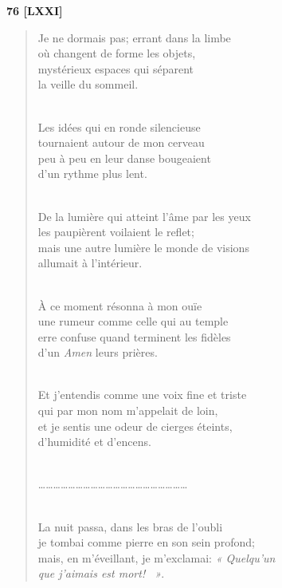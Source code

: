 \documentclass[a4paper,11pt]{book}
\begin{document}
\bigskip

\begin{center} {\bf 76 [LXXI]}  \end{center}

\begin{verse}
Je ne dormais pas; errant dans la limbe \\
où changent de forme les objets, \\
mystérieux espaces qui séparent \\
la veille du sommeil. \\ \

Les idées qui en ronde silencieuse \\
tournaient autour de mon cerveau \\
peu à peu en leur danse bougeaient \\
d'un rythme plus lent. \\ \

De la lumière qui atteint l'âme par les yeux \\
les paupièrent voilaient le reflet; \\
mais une autre lumière le monde de visions \\
allumait à l'intérieur. \\ \

À ce moment résonna à mon ouïe \\
une rumeur comme celle qui au temple \\
erre confuse quand terminent les fidèles \\
d'un {\em Amen\/} leurs prières. \\ \

Et j'entendis comme une voix fine et triste \\
qui par mon nom m'appelait de loin, \\
et je sentis une odeur de cierges éteints, \\
d'humidité et d'encens. \\ \

\ldots\ldots\ldots\ldots\ldots\ldots\ldots\ldots\ldots\ldots\ldots\ldots\ldots\ldots\ldots\ldots\ldots\ldots\ldots\ldots \\ \

La nuit passa, dans les bras de l'oubli \\
je tombai comme pierre en son sein profond; \\
mais, en m'éveillant, je m'exclamai: {\em « Quelqu'un \\
que j'aimais est mort! ~»}. \\
\end{verse}
\end{document}
